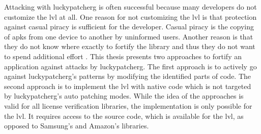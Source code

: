 Attacking with \gls{luckypatcherg} is often successful because many developers do not customize the \gls{lvl} at all.
One reason for not customizing the \gls{lvl} is that protection against casual piracy is sufficient for the developer.
Casual piracy is the copying of \gls{apk}s from one device to another by uninformed users.
\newline
Another reason is that they do not know where exactly to fortify the library and thus they do not want to spend additional effort \cite{developersSecuring}.
\newline
\newline
This thesis presents two approaches to fortify an application against attacks by \gls{luckypatcherg}.
\newline
The first approach is to actively go against \gls{luckypatcherg}'s patterns by modifying the identified parts of code.
\newline
The second approach is to implement the \gls{lvl} with native code which is not targeted by \gls{luckypatcherg}'s auto patching modes.
\newline
While the idea of the approaches is valid for all license verification libraries, the implementation is only possible for the \gls{lvl}.
It requires access to the source code, which is available for the \gls{lvl}, as opposed to Samsung's and Amazon's libraries.
